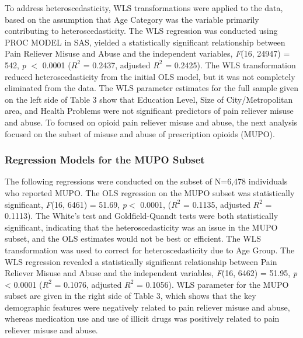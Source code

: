 \documentclass[sigconf]{acmart}
\begin{document}
To address heteroscedasticity, WLS transformations were applied to the data, 
based on the assumption that Age Category was the variable primarily 
contributing to heteroscedasticity. The WLS regression was conducted using 
PROC MODEL in SAS, yielded a statistically significant relationship between 
Pain Reliever Misuse and Abuse and the independent variables, 
\textit{F}(16, 24947) = 542, \textit{p} $<$ 0.0001 ($R^2$ = 0.2437, 
adjusted $R^2$ = 0.2425). The WLS transformation reduced heteroscedasticity 
from the initial OLS model, but it was not completely eliminated from the data. 
The WLS parameter estimates for the full sample given on the left side of 
Table 3 show that Education Level, Size of City/Metropolitan area, and Health 
Problems  were not significant predictors of pain reliever misuse and abuse. 
To focused on opioid pain reliever misuse and abuse, the next analysis focused 
on the  subset of misuse and abuse of prescription opioids (MUPO). 


\subsubsection{Regression Models for the MUPO Subset} 

The following regressions were conducted on the subset of N=6,478 individuals 
who reported MUPO. The OLS regression on the MUPO subset was statistically 
significant, \textit{F}(16, 6461) = 51.69, \textit{p}$<$ 0.0001, ($R^2$ = 
0.1135, adjusted $R^2$ = 0.1113). The White’s test and Goldfield-Quandt tests 
were both statistically significant, indicating that the heteroscedasticity 
was an issue in the MUPO subset, and the OLS estimates would not be best or 
efficient. The WLS transformation was used to correct for heteroscedasticity 
due to Age Group. The WLS regression revealed a statistically significant 
relationship between Pain Reliever Misuse and Abuse and the independent 
variables, \textit{F}(16, 6462) = 51.95, \textit{p} < 0.0001 ($R^2$ = 0.1076, 
adjusted $R^2$ = 0.1056). WLS parameter for the MUPO subset are given in the 
right side of Table 3, which shows that the key demographic features were 
negatively related to pain reliever misuse and abuse, whereas medication 
use and use of illicit drugs was positively related to pain reliever misuse 
and abuse. 
\end{document}
